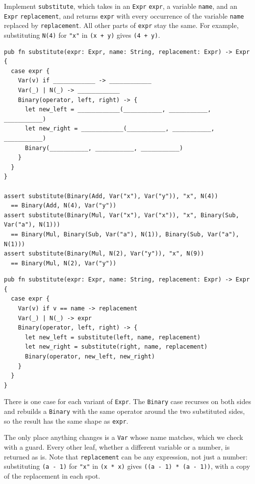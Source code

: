 \begin{blocksection}
\question Implement \texttt{substitute}, which takes in an \lstinline{Expr} \texttt{expr}, a variable \texttt{name}, and an \lstinline{Expr} \texttt{replacement}, and returns \texttt{expr} with every occurrence of the variable \texttt{name} replaced by \texttt{replacement}. All other parts of \texttt{expr} stay the same. For example, substituting \lstinline{N(4)} for \texttt{"x"} in \lstinline{(x + y)} gives \lstinline{(4 + y)}.
\begin{lstlisting}
pub fn substitute(expr: Expr, name: String, replacement: Expr) -> Expr {
  case expr {
    Var(v) if ____________ -> ____________
    Var(_) | N(_) -> ____________
    Binary(operator, left, right) -> {
      let new_left = ____________(___________, ___________, ___________)
      let new_right = ____________(___________, ___________, ___________)
      Binary(___________, ___________, ___________)
    }
  }
}

assert substitute(Binary(Add, Var("x"), Var("y")), "x", N(4))
  == Binary(Add, N(4), Var("y"))
assert substitute(Binary(Mul, Var("x"), Var("x")), "x", Binary(Sub, Var("a"), N(1)))
  == Binary(Mul, Binary(Sub, Var("a"), N(1)), Binary(Sub, Var("a"), N(1)))
assert substitute(Binary(Mul, N(2), Var("y")), "x", N(9))
  == Binary(Mul, N(2), Var("y"))
\end{lstlisting}

\begin{solution}
\begin{lstlisting}
pub fn substitute(expr: Expr, name: String, replacement: Expr) -> Expr {
  case expr {
    Var(v) if v == name -> replacement
    Var(_) | N(_) -> expr
    Binary(operator, left, right) -> {
      let new_left = substitute(left, name, replacement)
      let new_right = substitute(right, name, replacement)
      Binary(operator, new_left, new_right)
    }
  }
}
\end{lstlisting}
\end{solution}

\begin{questionmeta}
  There is one case for each variant of \lstinline{Expr}. The \lstinline{Binary} case recurses on both sides and rebuilds a \lstinline{Binary} with the same operator around the two substituted sides, so the result has the same shape as \texttt{expr}.

  The only place anything changes is a \lstinline{Var} whose name matches, which we check with a guard. Every other leaf, whether a different variable or a number, is returned as is. Note that \texttt{replacement} can be any expression, not just a number: substituting \lstinline{(a - 1)} for \texttt{"x"} in \lstinline{(x * x)} gives \lstinline{((a - 1) * (a - 1))}, with a copy of the replacement in each spot.
\end{questionmeta}
\end{blocksection}